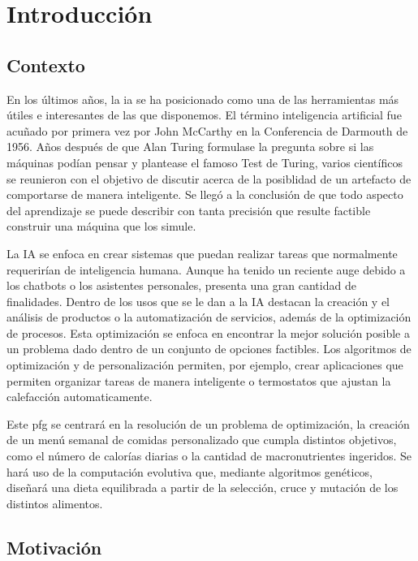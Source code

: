 \chapter{Introducción}
\label{ch:introduccion}

\section{Contexto}
En los últimos años, la \gls{ia} se ha posicionado como una de las herramientas más útiles e interesantes de las que disponemos. El término inteligencia artificial fue acuñado por primera vez por John McCarthy en la Conferencia de Darmouth de 1956. Años después de que Alan Turing formulase la pregunta sobre si las máquinas podían pensar y plantease el famoso Test de Turing, varios científicos se reunieron con el objetivo de discutir acerca de la posiblidad de un artefacto de comportarse de manera inteligente. Se llegó a la conclusión de que todo aspecto del aprendizaje se puede describir con tanta precisión que resulte factible construir una máquina que los simule.

La IA se enfoca en crear sistemas que puedan realizar tareas que normalmente requerirían de inteligencia humana. Aunque ha tenido un reciente auge debido a los chatbots o los asistentes personales, presenta una gran cantidad de finalidades. Dentro de los usos que se le dan a la IA destacan la creación y el análisis de productos o la automatización de servicios, además de la optimización de procesos. Esta optimización se enfoca en encontrar la mejor solución posible a un problema dado dentro de un conjunto de opciones factibles. Los algoritmos de optimización y de personalización permiten, por ejemplo, crear aplicaciones que permiten organizar tareas de manera inteligente o termostatos que ajustan la calefacción automaticamente.

Este \gls{pfg} se centrará en la resolución de un problema de optimización, la creación de un menú semanal de comidas personalizado que cumpla distintos objetivos, como el número de calorías diarias o la cantidad de macronutrientes ingeridos. Se hará uso de la computación evolutiva que, mediante algoritmos genéticos, diseñará una dieta equilibrada a partir de la selección, cruce y mutación de los distintos alimentos.


\section{Motivación}

